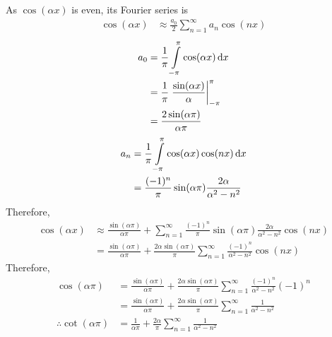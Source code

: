 \documentclass[fleqn, a4paper, 11pt, oneside]{amsart}
\theoremstyle{definition}
\theoremstyle{theorem}
\begin{document}
\begin{solution}
	As $\cos(\alpha x)$ is even, its Fourier series is
	\begin{align*}
		\cos(\alpha x) & \approx \frac{a_0}{2} \sum\limits_{n = 1}^{\infty} a_n \cos(n x)
	\end{align*}
	\begin{align*}
		a_0 & = \frac{1}{\pi} \int\limits_{-\pi}^{\pi} \cos(\alpha x) \dif x            \\
                    & = \frac{1}{\pi} \left. \frac{\sin(\alpha x)}{\alpha} \right|_{-\pi}^{\pi} \\
                    & = \frac{2 \sin(\alpha \pi)}{\alpha \pi}
	\end{align*}
	\begin{align*}
		a_n & = \frac{1}{\pi} \int\limits_{-\pi}^{\pi} \cos(\alpha x) \cos(n x) \dif x \\
                    & = \frac{(-1)^n}{\pi} \sin(\alpha \pi) \frac{2 \alpha}{\alpha^2 - n^2}
	\end{align*}
	Therefore,
	\begin{align*}
		\cos(\alpha x) & \approx \frac{\sin(\alpha \pi)}{\alpha \pi} + \sum\limits_{n = 1}^{\infty} \frac{(-1)^n}{\pi} \sin(\alpha \pi) \frac{2 \alpha}{\alpha^2 - n^2} \cos(n x) \\
                               & = \frac{\sin(\alpha \pi)}{\alpha \pi} + \frac{2 \alpha \sin(\alpha \pi)}{\pi} \sum\limits_{n = 1}^{\infty} \frac{(-1)^n}{\alpha^2 - n^2} \cos(n x)
	\end{align*}
	Therefore,
	\begin{align*}
		\cos(\alpha \pi)            & = \frac{\sin(\alpha \pi)}{\alpha \pi} + \frac{2 \alpha \sin(\alpha \pi)}{\pi} \sum\limits_{n = 1}^{\infty} \frac{(-1)^n}{\alpha^2 - n^2} (-1)^n \\
                                            & = \frac{\sin(\alpha \pi)}{\alpha \pi} + \frac{2 \alpha \sin(\alpha \pi)}{\pi} \sum\limits_{n = 1}^{\infty} \frac{1}{\alpha^2 - n^2}             \\
		\therefore \cot(\alpha \pi) & = \frac{1}{\alpha \pi} + \frac{2 \alpha}{\pi} \sum\limits_{n = 1}^{\infty} \frac{1}{\alpha^2 - n^2}
	\end{align*}
\end{solution}
\end{document}
